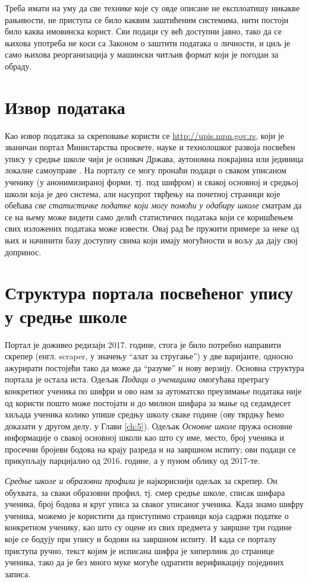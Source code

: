 Треба имати на уму да све технике које су овде описане не експлоатишу никакве рањивости, не приступа се било каквим заштићеним системима, нити постоји било каква имовинска корист. Сви подаци су већ доступни јавно, тако да се њихова употреба не коси са Законом о заштити података о личности, и циљ је само њихова реорганизација у машински читљив формат који је погодан за обраду.

\section{Извор података}

Као извор података за скреповање користи се \url{http://upis.mpn.gov.rs}, који је званичан портал Министарства просвете, науке и технолошког развоја посвећен упису у средње школе чији је оснивач Држава, аутономна покрајина или јединица локалне самоуправе \citep{upismpn}. На порталу се могу пронаћи подаци о сваком уписаном ученику (у анонимизираној форми, тј. под шифром) и свакој основној и средњој школи која је део система, али насупрот тврђењу на почетној страници које обећава \emph{све статистичке податке који могу помоћи у одабиру школе} \citep{upismpn} сматрам да се на њему може видети само делић статистичих података који се коришћењем свих изложених података може извести. Овај рад ће пружити примере за неке од њих и начинити базу доступну свима који имају могућности и вољу да дају свој допринос.

\section{Структура портала посвећеног упису у средње школе}

Портал је доживео редизајн 2017. године, стога је било потребно направити скрепер (енгл. scraper, у значењу \enquote{алат за стругање}) у две варијанте, односно ажурирати постојећи тако да може да \enquote{разуме} и нову верзију. Основна структура портала је остала иста. Одељак \textit{Подаци о ученицима} омогућава претрагу конкретног ученика по шифри и ово нам за аутоматско преузимање података није од користи пошто може постојати и до милион шифара за мање од седамдесет хиљада ученика колико упише средњу школу сваке године (ову тврдњу ћемо доказати у другом делу, у Глави \ref{ch:5}). Одељак \textit{Основне школе} пружа основне информације о свакој основној школи као што су име, место, број ученика и просечни бројеви бодова на крају разреда и на завршном испиту; ови подаци се прикупљају парцијално од 2016. године, а у пуном облику од 2017-те. 

\textit{Средње школе и образовни профили} је најкориснији одељак за скрепер. Он обухвата, за сваки образовни профил, тј. смер средње школе, списак шифара ученика, број бодова и круг уписа за сваког уписаног ученика. Када знамо шифру ученика, можемо је користити да приступимо страници која садржи податке о конкретном ученику, као што су оцене из свих предмета у завршне три године које се бодују при упису и бодови на завршном испиту. И када се порталу приступа ручно, текст којим је исписана шифра је хиперлинк до странице ученика, тако да је без много муке могуће одратити верификацију појединих записа.